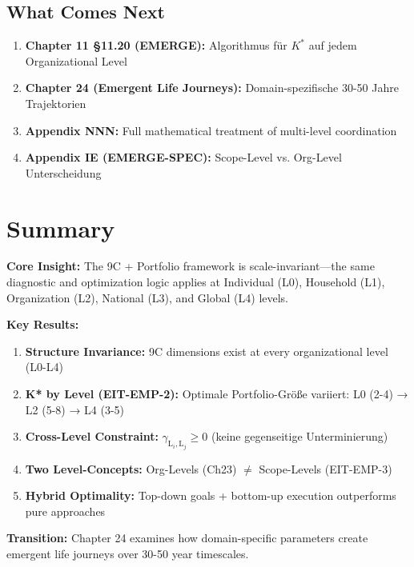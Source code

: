\subsection{What Comes Next}
\label{sec:ch23-what-comes-next}

\begin{enumerate}
    \item \textbf{Chapter 11 §11.20 (EMERGE):} Algorithmus für $K^*$ auf jedem Organizational Level
    \item \textbf{Chapter 24 (Emergent Life Journeys):} Domain-spezifische 30-50 Jahre Trajektorien
    \item \textbf{Appendix NNN:} Full mathematical treatment of multi-level coordination
    \item \textbf{Appendix IE (EMERGE-SPEC):} Scope-Level vs. Org-Level Unterscheidung
\end{enumerate}


\section{Summary}
\label{sec:ch23-summary}

\begin{tcolorbox}[colback=blue!5!white, colframe=blue!75!black,
    title={\textbf{Chapter 23 Summary: Multi-Level Implementation}}]

\textbf{Core Insight:} The 9C + Portfolio framework is scale-invariant---the same diagnostic and optimization logic applies at Individual (L0), Household (L1), Organization (L2), National (L3), and Global (L4) levels.

\textbf{Key Results:}
\begin{enumerate}[nosep]
    \item \textbf{Structure Invariance:} 9C dimensions exist at every organizational level (L0-L4)
    \item \textbf{K* by Level (EIT-EMP-2):} Optimale Portfolio-Größe variiert: L0 (2-4) → L2 (5-8) → L4 (3-5)
    \item \textbf{Cross-Level Constraint:} $\gamma_{\text{L}_i, \text{L}_j} \geq 0$ (keine gegenseitige Unterminierung)
    \item \textbf{Two Level-Concepts:} Org-Levels (Ch23) $\neq$ Scope-Levels (EIT-EMP-3)
    \item \textbf{Hybrid Optimality:} Top-down goals + bottom-up execution outperforms pure approaches
\end{enumerate}

\textbf{Transition:} Chapter 24 examines how domain-specific parameters create emergent life journeys over 30-50 year timescales.

\end{tcolorbox}


